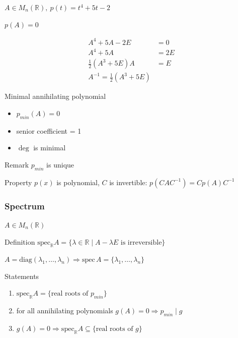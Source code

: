 \documentclass[fullscreen=true, bookmarks=true, hyperref={pdfencoding=unicode}]{beamer}
\begin{document}
\begin{frame}
\begin{example}
  $A \in M_{n}(\mathbb{R}),\ p(t) = t^4 + 5t -2$

  $p(A) = 0$
\end{example}
  \pause
  \begin{align*}
    A^4 + 5A - 2E &= 0 \\
    A^4 + 5A &= 2E \\
    \frac12(A^3 + 5E) A &= E \\
    \boxed{A^{-1} = \frac12(A^3 + 5E)}
  \end{align*}
\end{frame}


\begin{frame}{Minimal annihilating polynomial}
    \begin{itemize}
      \item $p_{min}(A) = 0$
      \item senior coefficient = 1
      \item $\deg$ is minimal
    \end{itemize}

    \pause
    \begin{block}{Remark}
      $p_{min}$ is unique
    \end{block}          

    \pause
    \begin{block}{Property}
      $p(x)$ is polynomial, $C$ is invertible: $p(CAC^{-1}) = Cp(A)C^{-1}$
    \end{block}          
\end{frame}


\begin{frame}
  \frametitle{Spectrum}
  $A \in M_{n}(\mathbb{R})$

  \begin{block}{Definition}
    $\mathrm{spec}_{\mathbb{R}} A = 
    \{ \lambda \in \mathbb{R} \mid A-\lambda E \text{ is irreversible} \}$
  \end{block}

  \pause
  \begin{example}
    $ A = \mathrm{diag}(\lambda_1, \dots, \lambda_n) \Rightarrow
    \mathrm{spec}\, A = \{\lambda_1, \dots, \lambda_n\}$
  \end{example}

  \begin{block}{Statements}
    \begin{enumerate}
      \pause\item $\mathrm{spec}_{\mathbb{R}} A = 
      \{ \text{real roots of } p_{min}\}$
      \pause\item for all annihilating polynomials 
      $g(A) = 0 \Rightarrow p_{min} \mid g$
      \pause\item $g(A) = 0 \Rightarrow \mathrm{spec}_{\mathbb{R}} A \subseteq 
      \{ \text{real roots of } g \}$
    \end{enumerate}
    
  \end{block}
\end{frame}
\end{document}
